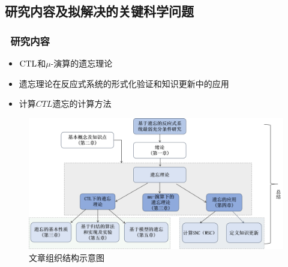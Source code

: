 \documentclass[9pt, CJK]{beamer}
\begin{document}
	
	\subsection{研究内容及拟解决的关键科学问题}

\begin{frame}
	\frametitle{~研究内容}
		\begin{itemize}
		\item  $\textrm{CTL}$和$\mu$-演算的遗忘理论
		\item 遗忘理论在反应式系统的形式化验证和知识更新中的应用
		\item 计算$CTL$遗忘的计算方法
	\end{itemize}
	\begin{figure}
		\includegraphics[scale=0.3]{figures/zuzhi}
		\caption{文章组织结构示意图}
	\end{figure}
\end{frame}
\end{document}
